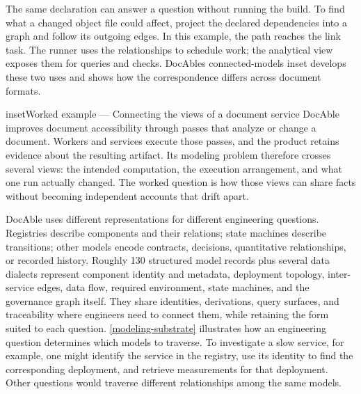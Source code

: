 The same declaration can answer a question without running the build. To find what a changed object file could affect, project the declared dependencies into a graph and follow its outgoing edges. In this example, the path reaches the link task. The runner uses the relationships to schedule work; the analytical view exposes them for queries and checks. DocAble\textquotesingle s connected-models inset develops these two uses and shows how the correspondence differs across document formats.





\begin{bookbox}{inset}{Worked example --- Connecting the views of a document service}
\label{inset-docable-connected-models}
DocAble improves document accessibility through passes that analyze or change a document. Workers and services execute those passes, and the product retains evidence about the resulting artifact. Its modeling problem therefore crosses several views: the intended computation, the execution arrangement, and what one run actually changed. The worked question is how those views can share facts without becoming independent accounts that drift apart.


DocAble uses different representations for different engineering questions. Registries describe components and their relations; state machines describe transitions; other models encode contracts, decisions, quantitative relationships, or recorded history. Roughly 130 structured model records plus several data dialects represent component identity and metadata, deployment topology, inter-service edges, data flow, required environment, state machines, and the governance graph itself. They share identities, derivations, query surfaces, and traceability where engineers need to connect them, while retaining the form suited to each question. \autoref{modeling-substrate} illustrates how an engineering question determines which models to traverse. To investigate a slow service, for example, one might identify the service in the registry, use its identity to find the corresponding deployment, and retrieve measurements for that deployment. Other questions would traverse different relationships among the same models.


\end{bookbox}
